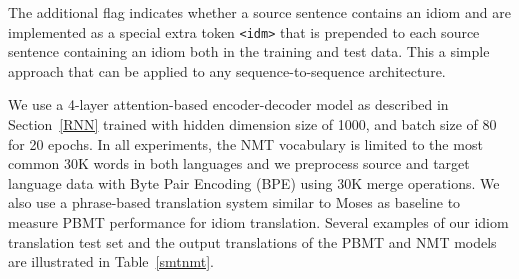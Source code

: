 The additional flag indicates whether a source sentence contains an idiom
and are implemented as a special extra token \texttt{<idm>} that is prepended to each source sentence containing an idiom both in the training and test data.
This a simple approach that can be applied to any sequence-to-sequence architecture. 

We use a 4-layer attention-based encoder-decoder model as described in Section~\ref{RNN} trained with hidden dimension size of 1000, and batch size of 80 for 20 epochs. 
%
In all experiments, the NMT vocabulary is limited to the most common 30K words in both languages and we preprocess source and target language data with Byte Pair Encoding (BPE) \citep{sennrich-haddow-birch:2016:P16-12} using 30K merge operations. 
We also use a phrase-based translation system similar to Moses \citep{koehn-etal-2007-moses} as baseline to measure PBMT performance for idiom translation.
Several examples of our idiom translation test set and the output translations of the PBMT and NMT models are illustrated in Table~\ref{smtnmt}.


